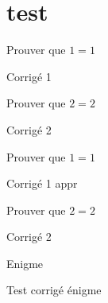 \documentclass[nocrop]{sesamanuel}
\begin{document}
\themaG
\chapter{test}


\exercicesbase

\begin{colonne*exercice}

  \begin{exercice*}[Exercice 1]
  Prouver que $1=1$
  \end{exercice*}
  
  \begin{corrige}
  Corrigé 1
  \end{corrige}
  
  \begin{exercice*}[Exercice 2]
  Prouver que $2=2$
  \end{exercice*}
  
  \begin{corrige}
  Corrigé 2
  \end{corrige}
 

\end{colonne*exercice}

\exercicesappr
\begin{colonne*exercice}

  \begin{exercice*}
  Prouver que $1=1$
  \end{exercice*}
  
  \begin{corrige}
  Corrigé 1 appr
  \end{corrige}
  
  \begin{exercice}
  Prouver que $2=2$
  \end{exercice}
  
  \begin{corrige}
  Corrigé 2
  \end{corrige}
 

\end{colonne*exercice}

\Recreation

\begin{enigme}
  Enigme
\end{enigme}

\begin{corrige}
   Test corrigé énigme
\end{corrige}

\AfficheCorriges[2]
\end{document}
